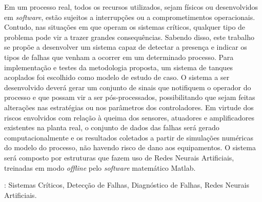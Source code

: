 Em um processo real, todos os recursos utilizados, sejam físicos ou
desenvolvidos em {\it software}, estão sujeitos a interrupções ou a
comprometimentos operacionais. Contudo, nas situações em que operam os sistemas
críticos, qualquer tipo de problema pode vir a trazer grandes consequências.
Sabendo disso, este trabalho se propõe a desenvolver um sistema capaz de
detectar a presença e indicar os tipos de falhas que venham a ocorrer em um
determinado processo. Para implementação e testes da metodologia proposta, um
sistema de tanques acoplados foi escolhido como modelo de estudo de caso. O
sistema a ser desenvolvido deverá gerar um conjunto de sinais que notifiquem o
operador do processo e que possam vir a ser pós-processados, possibilitando que
sejam feitas alterações nas estratégias ou nos parâmetros dos controladores. Em
virtude dos riscos envolvidos com relação à queima dos sensores, atuadores e
amplificadores existentes na planta real, o conjunto de dados das falhas será
gerado computacionalmente e os resultados coletados a partir de simulações
numéricas do modelo do processo, não havendo risco de dano aos equipamentos. O
sistema será composto por estruturas que fazem uso de Redes Neurais Artificiais,
treinadas em modo {\it offline} pelo {\it software} matemático Matlab\reg.

\vspace{1.5ex}

: Sistemas Críticos, Detecção de Falhas, Diagnóstico de
Falhas, Redes Neurais Artificiais.
